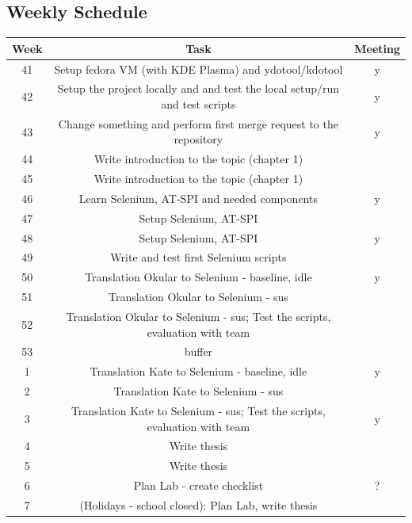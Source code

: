 \documentclass{article}
\begin{document}
    \begin{center}
    \section*{Weekly Schedule}
    \begin{tabular}{ | c | c | c | }
    \hline
    Week & Task & Meeting \\
    \hline\hline
    41  & Setup fedora VM (with KDE Plasma) and ydotool/kdotool & y \\
    \hline
    42  & Setup the project locally and and test the local setup/run and test scripts & y \\
    \hline
    43  & Change something and perform first merge request to the repository & y \\
    \hline
    44  & Write introduction to the topic (chapter 1) & \\
    \hline
    45  & Write introduction to the topic (chapter 1) & \\
    \hline
    46  & Learn Selenium, AT-SPI and needed components & y \\
    \hline
    47  & Setup Selenium, AT-SPI & \\
    \hline
    48  &  Setup Selenium, AT-SPI & y \\
    \hline
    49  &  Write and test first Selenium scripts & \\
    \hline
    50  &  Translation Okular to Selenium - baseline, idle & y \\
    \hline
    51  & Translation Okular to Selenium - sus & \\
    \hline
    52  & Translation Okular to Selenium - sus; Test the scripts, evaluation with team & \\
    \hline
    53  & buffer & \\
    \hline
    1  & Translation Kate to Selenium - baseline, idle & y \\
    \hline
    2  & Translation Kate to Selenium - sus & \\
    \hline
    3  & Translation Kate to Selenium - sus; Test the scripts, evaluation with team & y \\
    \hline
    4  & Write thesis & \\
    \hline
    5  & Write thesis & \\
    \hline
    6  & Plan Lab - create checklist & ? \\
    \hline
    7  & (Holidays - school closed): Plan Lab, write thesis &  \\
    \hline

\end{tabular}
\end{center}
\end{document}
